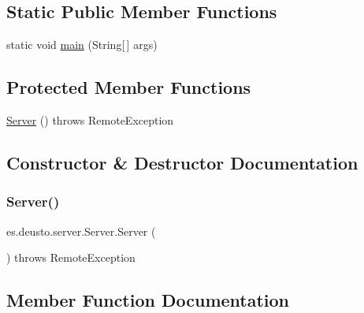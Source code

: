 \subsection*{Static Public Member Functions}
\begin{DoxyCompactItemize}
\item 
static void \mbox{\hyperlink{classes_1_1deusto_1_1server_1_1_server_a750bb0d7dbd89246a3602f2e20d03fb5}{main}} (String\mbox{[}$\,$\mbox{]} args)
\end{DoxyCompactItemize}
\subsection*{Protected Member Functions}
\begin{DoxyCompactItemize}
\item 
\mbox{\hyperlink{classes_1_1deusto_1_1server_1_1_server_a84f78162a65dd737f224eb2f94c43023}{Server}} ()  throws Remote\+Exception 
\end{DoxyCompactItemize}


\subsection{Constructor \& Destructor Documentation}
\mbox{\label{classes_1_1deusto_1_1server_1_1_server_a84f78162a65dd737f224eb2f94c43023}} 
\subsubsection{\texorpdfstring{Server()}{Server()}}
{\footnotesize\ttfamily es.\+deusto.\+server.\+Server.\+Server (\begin{DoxyParamCaption}{ }\end{DoxyParamCaption}) throws Remote\+Exception\hspace{0.3cm}{\ttfamily [protected]}}



\subsection{Member Function Documentation}
\mbox{\label{classes_1_1deusto_1_1server_1_1_server_a0a3160bdb7bfaab43143f1b0e68aee51}} 
